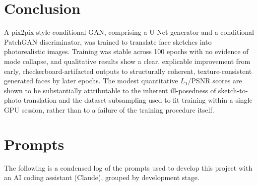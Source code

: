 \documentclass[conference]{IEEEtran}
\begin{document}
\section{Conclusion}

A pix2pix-style conditional GAN, comprising a U-Net generator and a conditional
PatchGAN discriminator, was trained to translate face sketches into photorealistic
images. Training was stable across 100 epochs with no evidence of mode collapse, and
qualitative results show a clear, explicable improvement from early, checkerboard-artifacted
outputs to structurally coherent, texture-consistent generated faces by later epochs.
The modest quantitative $L_1$/PSNR scores are shown to be substantially attributable to
the inherent ill-posedness of sketch-to-photo translation and the dataset subsampling
used to fit training within a single GPU session, rather than to a failure of the
training procedure itself.

\section*{Prompts}

The following is a condensed log of the prompts used to develop this project with an AI
coding assistant (Claude), grouped by development stage.
\end{document}

